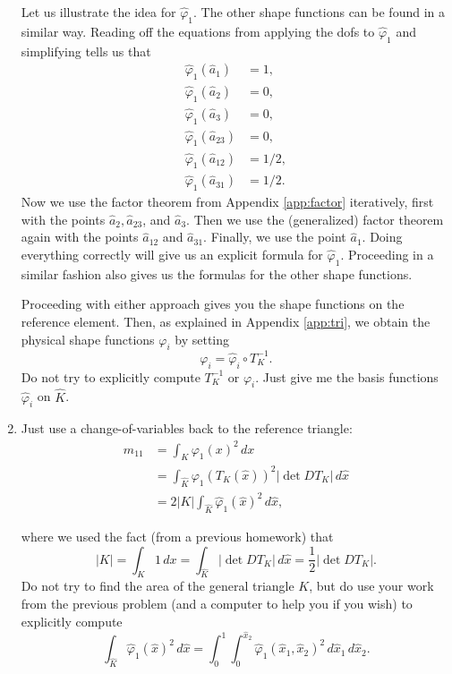 \documentclass{article}
\theoremstyle{plain}
\theoremstyle{definition}
\theoremstyle{remark}
\begin{document}
\begin{enumerate}
	      Let us illustrate the idea for $\widehat \varphi_1$.
	      The other shape functions can be found in a similar way.
	      Reading off the equations from applying the dofs to $\widehat\varphi_1$ and simplifying tells us that
	      \begin{align*}
		      \widehat\varphi_1(\widehat a_1)    & = 1,   \\
		      \widehat\varphi_1(\widehat a_2)    & = 0,   \\
		      \widehat\varphi_1(\widehat a_3)    & = 0,   \\
		      \widehat\varphi_1(\widehat a_{23}) & = 0,   \\
		      \widehat\varphi_1(\widehat a_{12}) & = 1/2, \\
		      \widehat\varphi_1(\widehat a_{31}) & = 1/2.
	      \end{align*}
	      Now we use the factor theorem from Appendix \ref{app:factor} iteratively, first with the points $\widehat a_2, \widehat a_{23}$, and $\widehat a_3$.
	      Then we use the (generalized) factor theorem again with the points $\widehat a_{12}$ and $\widehat a_{31}$.
	      Finally, we use the point $\widehat a_1$.
	      Doing everything correctly will give us an explicit formula for $\widehat\varphi_1$.
	      Proceeding in a similar fashion also gives us the formulas for the other shape functions.

	      Proceeding with either approach gives you the shape functions on the reference element.
	      Then, as explained in Appendix \ref{app:tri}, we obtain the physical shape functions $\varphi_i$ by setting \[\varphi_i = \widehat \varphi_i \circ T_K^{-1}.\]
	      Do not try to explicitly compute $T_K^{-1}$ or $\varphi_i$.
	      Just give me the basis functions $\widehat\varphi_i$ on $\widehat K$.

	\item Just use a change-of-variables back to the reference triangle:
	      \begin{align*}
		      m_{11} & = \int_K \varphi_1(x)^2\,dx                                              \\
		             & = \int_{\widehat K} \varphi_1(T_K(\widehat x))^2|\det DT_K|\,d\widehat x \\
		             & = 2|K|\int_{\widehat K} \widehat \varphi_1(\widehat x)^2\,d\widehat x,
	      \end{align*}

	      where we used the fact (from a previous homework) that \[|K| = \int_K 1\,dx = \int_{\widehat K}|\det DT_K|\,d\widehat x = \frac{1}{2}|\det DT_K|.\]
	      Do not try to find the area of the general triangle $K$, but do use your work from the previous problem (and a computer to help you if you wish) to explicitly compute \[\int_{\widehat K}\widehat\varphi_1(\widehat x)^2\,d\widehat x = \int_0^1\int_0^{\widehat x_2}\widehat\varphi_1(\widehat x_1,\widehat x_2)^2\,d\widehat x_1\,d\widehat x_2.\]
\end{enumerate}
\end{document}
